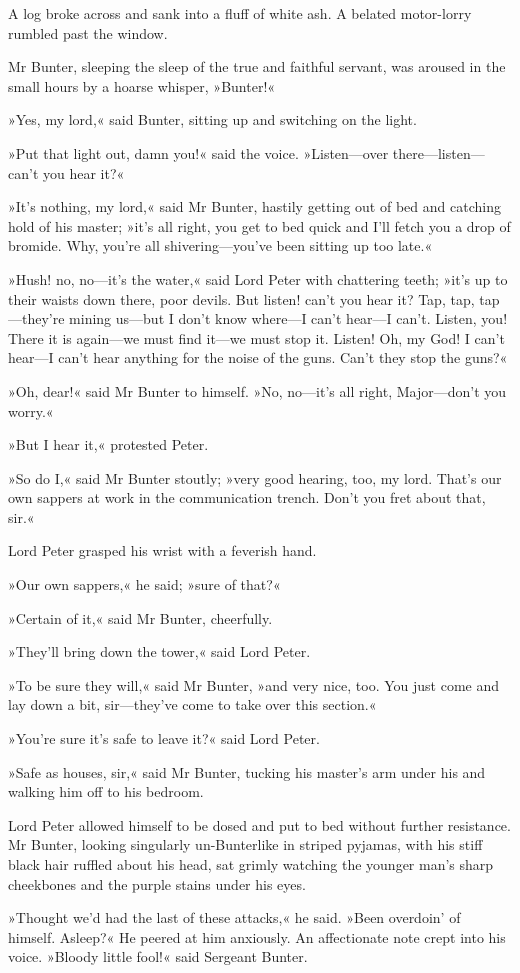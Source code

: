 A log broke across and sank into a fluff of white ash. A belated motor-lorry rumbled past the window.

Mr Bunter, sleeping the sleep of the true and faithful servant, was aroused in the small hours by a hoarse whisper, »Bunter!«

»Yes, my lord,« said Bunter, sitting up and switching on the light.

»Put that light out, damn you!« said the voice. »Listen—over there—listen—can't you hear it?«

»It's nothing, my lord,« said Mr Bunter, hastily getting out of bed and catching hold of his master; »it's all right, you get to bed quick and I'll fetch you a drop of bromide. Why, you're all shivering—you've been sitting up too late.«

»Hush! no, no—it's the water,« said Lord Peter with chattering teeth; »it's up to their waists down there, poor devils. But listen! can't you hear it? Tap, tap, tap—they're mining us—but I don't know where—I can't hear—I can't. Listen, you! There it is again—we must find it—we must stop it\textellipsis . Listen! Oh, my God! I can't hear—I can't hear anything for the noise of the guns. Can't they stop the guns?«

»Oh, dear!« said Mr Bunter to himself. »No, no—it's all right, Major—don't you worry.«

»But I hear it,« protested Peter.

»So do I,« said Mr Bunter stoutly; »very good hearing, too, my lord. That's our own sappers at work in the communication trench. Don't you fret about that, sir.«

Lord Peter grasped his wrist with a feverish hand.

»Our own sappers,« he said; »sure of that?«

»Certain of it,« said Mr Bunter, cheerfully.

»They'll bring down the tower,« said Lord Peter.

»To be sure they will,« said Mr Bunter, »and very nice, too. You just come and lay down a bit, sir—they've come to take over this section.«

»You're sure it's safe to leave it?« said Lord Peter.

»Safe as houses, sir,« said Mr Bunter, tucking his master's arm under his and walking him off to his bedroom.

Lord Peter allowed himself to be dosed and put to bed without further resistance. Mr Bunter, looking singularly un-Bunterlike in striped pyjamas, with his stiff black hair ruffled about his head, sat grimly watching the younger man's sharp cheekbones and the purple stains under his eyes.

»Thought we'd had the last of these attacks,« he said. »Been overdoin' of himself. Asleep?« He peered at him anxiously. An affectionate note crept into his voice. »Bloody little fool!« said Sergeant Bunter.